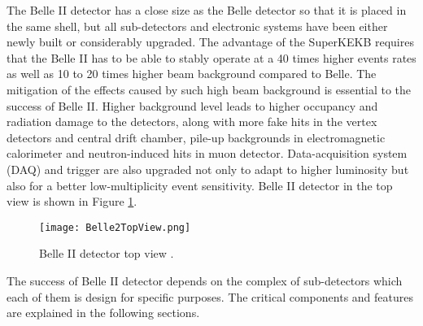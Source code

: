 The Belle II detector has a close size as the Belle detector so that it is placed in the same shell, but all sub-detectors and electronic systems have been either newly built or considerably upgraded. The advantage of the SuperKEKB requires that the Belle II has to be able to stably operate at a 40 times higher events rates as well as 10 to 20 times higher beam background compared to Belle. The mitigation of the effects caused by such high beam background is essential to the success of Belle II. Higher background level leads to higher occupancy and radiation damage to the detectors, along with more fake hits in the vertex detectors and central drift chamber, pile-up backgrounds in electromagnetic calorimeter and neutron-induced hits in muon detector. Data-acquisition system (DAQ) and trigger are also upgraded not only to adapt to higher luminosity but also for a better low-multiplicity event sensitivity. Belle II detector in the top view is shown in Figure \ref{fig:belle2_view}.

\begin{comment}
 and expected performances are summarized as follows: 


\textbullet \space vertex resolution of $B$ mesons of $\sim 50 \: \mu\text{m}$,

\textbullet \space excellent reconstruction efficiency for charged tracks down to several 100 MeV and fairly good efficiency for charged tracks down to $\sim$ 50 MeV,

\textbullet \space excellent momentum resolution up to 8 GeV/c,

\textbullet \space highly efficient particle identification to separate $\pi^{\pm}$, $\mu^{\pm}$, $e^{\pm}$, $K^{\pm}$ and $p$ at full energy range of experiment,

\textbullet \space full cover of experimental acceptance solid angle,

\textbullet \space ultra fast and highly efficiency DAQ and trigger system to cope with large data quantities and fast triggering frequency. 
\end{comment}

\begin{figure}[htbp]
	\centering 
	\texttt{[image: Belle2TopView.png]}
	\caption{Belle II detector top view \cite{b2book}.}
	\label{fig:belle2_view}
\end{figure}

The success of Belle II detector depends on the complex of sub-detectors which each of them is design for specific purposes. The critical components and features are explained in the following sections. 

